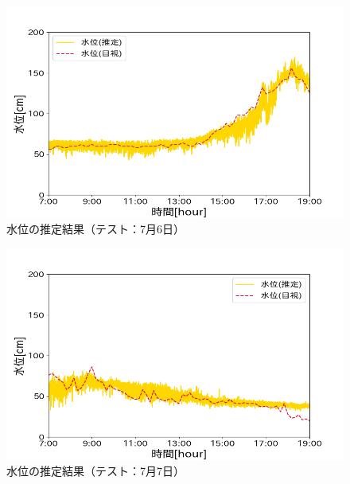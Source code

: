 \begin{figure}[ht] 
  \begin{center}
    \includegraphics[width=\linewidth]{image/0706_kousa.png}
  \end{center}
  \caption{水位の推定結果（テスト：7月6日）}
  \label{kousa_0706}
\end{figure}

\begin{figure}[ht] 
  \begin{center}
    \includegraphics[width=\linewidth]{image/0707_kousa.png}
  \end{center}
  \caption{水位の推定結果（テスト：7月7日）}
  \label{kousa_0707}
\end{figure}

